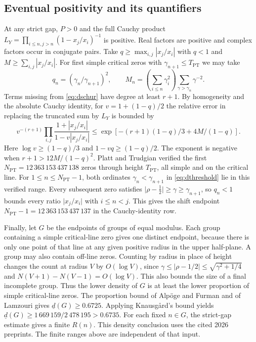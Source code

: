 \documentclass[11pt,a4paper,reqno]{amsart}
\numberwithin{equation}{section}
\begin{document}
\subsection{Eventual positivity and its quantifiers}
At any strict gap, \(P>0\) and the full Cauchy product \(L_Y=\prod_{i\le n,j>n}(1-x_j/x_i)^{-1}\) is positive. Real factors are positive and complex factors occur in conjugate pairs. Take \(q\ge\max_{i,j}|x_j/x_i|\) with \(q<1\) and \(M\ge\sum_{i,j}|x_j/x_i|\). For first simple critical zeros with \(\gamma_{n+1}\le T_{\mathrm{PT}}\) we may take
\begin{equation}\label{eq:dthreshold}
 q_n=(\gamma_n/\gamma_{n+1})^2,\qquad
 M_n=\left(\sum_{i\le n}\gamma_i^2\right)\sum_{\gamma>\gamma_n}\gamma^{-2}.
\end{equation}
Terms missing from \eqref{eq:dschur} have degree at least \(r+1\). By homogeneity and the absolute Cauchy identity, for \(v=1+(1-q)/2\) the relative error in replacing the truncated sum by \(L_Y\) is bounded by
\[
 v^{-(r+1)}\prod_{i,j}\frac{1+|x_j/x_i|}{1-v|x_j/x_i|}
 \le \exp\!\left[-(r+1)(1-q)/3+4M/(1-q)\right].
\]
Here \(\log v\ge(1-q)/3\) and \(1-vq\ge(1-q)/2\). The exponent is negative when \(r+1>12M/(1-q)^2\). Platt and Trudgian \cite[Theorem~1 and \S2]{pt} verified the first \(N_{\mathrm{PT}}=12\,363\,153\,437\,138\) zeros through height \(T_{\mathrm{PT}}\), all simple and on the critical line. For \(1\le n\le N_{\mathrm{PT}}-1\), both ordinates \(\gamma_n<\gamma_{n+1}\) in \eqref{eq:dthreshold} lie in this verified range. Every subsequent zero satisfies \(\lvert\rho-\tfrac12\rvert\ge\gamma\ge\gamma_{n+1}\), so \(q_n<1\) bounds every ratio \(\lvert x_j/x_i\rvert\) with \(i\le n<j\). This gives the shift endpoint \(N_{\mathrm{PT}}-1=12\,363\,153\,437\,137\) in the Cauchy-identity row.

Finally, let \(G\) be the endpoints of groups of equal modulus. Each group containing a simple critical-line zero gives one distinct endpoint, because there is only one point of that line at any given positive radius in the upper half-plane. A group may also contain off-line zeros. Counting by radius in place of height changes the count at radius \(V\) by \(O(\log V)\), since \(\gamma\le|\rho-1/2|\le\sqrt{\gamma^2+1/4}\) and \(N(V+1)-N(V-1)=O(\log V)\). This also bounds the size of a final incomplete group. Thus the lower density of \(G\) is at least the lower proportion of simple critical-line zeros. The proportion bound of Alpöge and Furman and of Lamzouri \cite{af,lam} gives \(\underline d(G)\ge0.6725\). Applying Knausgård's bound \cite[Theorem~1.3]{knausgard} yields \(\underline d(G)\ge 1\,669\,159/2\,478\,195>0.6735\). For each fixed \(n\in G\), the strict-gap estimate gives a finite \(R(n)\). This density conclusion uses the cited 2026 preprints. The finite ranges above are independent of that input.
\end{document}

